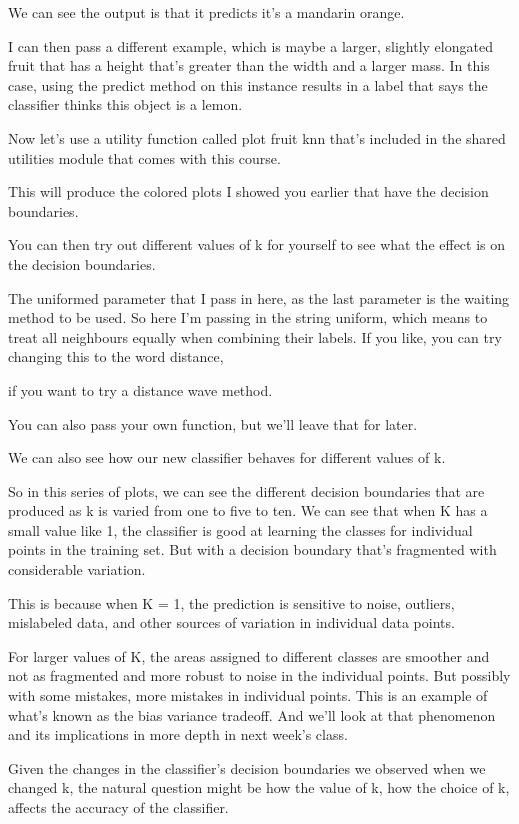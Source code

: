 \begin{multicols}{2}
We can see the output is that it predicts it's a mandarin orange. 

I can then pass a different example, which is maybe a larger, slightly elongated fruit that has a height that's greater than the width and a larger mass. In this case, using the predict method on this instance results in a label that says the classifier thinks this object is a lemon. 

Now let's use a utility function called plot fruit knn that's included in the shared utilities module that comes with this course. 

This will produce the colored plots I showed you earlier that have the decision boundaries. 

You can then try out different values of k for yourself to see what the effect is on the decision boundaries. 

The uniformed parameter that I pass in here, as the last parameter is the waiting method to be used. So here I'm passing in the string uniform, which means to treat all neighbours equally when combining their labels. If you like, you can try changing this to the word distance, 

if you want to try a distance wave method. 

You can also pass your own function, but we'll leave that for later. 

We can also see how our new classifier behaves for different values of k. 

So in this series of plots, we can see the different decision boundaries that are produced as k is varied from one to five to ten. We can see that when K has a small value like 1, the classifier is good at learning the classes for individual points in the training set. But with a decision boundary that's fragmented with considerable variation. 

This is because when K = 1, the prediction is sensitive to noise, outliers, mislabeled data, and other sources of variation in individual data points. 

For larger values of K, the areas assigned to different classes are smoother and not as fragmented and more robust to noise in the individual points. But possibly with some mistakes, more mistakes in individual points. This is an example of what's known as the bias variance tradeoff. And we'll look at that phenomenon and its implications in more depth in next week's class. 

Given the changes in the classifier's decision boundaries we observed when we changed k, the natural question might be how the value of k, how the choice of k, affects the accuracy of the classifier. 


\end{multicols}
